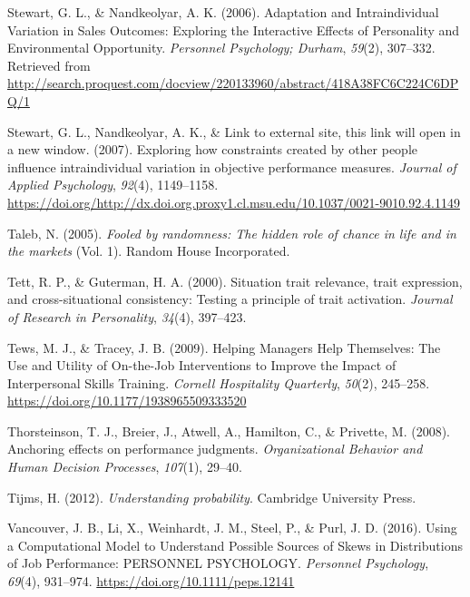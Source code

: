 \documentclass[english,,man]{apa6}
\begin{document}
\leavevmode\hypertarget{ref-stewart_adaptation_2006}{}%
Stewart, G. L., \& Nandkeolyar, A. K. (2006). Adaptation and Intraindividual Variation in Sales Outcomes: Exploring the Interactive Effects of Personality and Environmental Opportunity. \emph{Personnel Psychology; Durham}, \emph{59}(2), 307--332. Retrieved from \url{http://search.proquest.com/docview/220133960/abstract/418A38FC6C224C6DPQ/1}

\leavevmode\hypertarget{ref-stewart_exploring_2007}{}%
Stewart, G. L., Nandkeolyar, A. K., \& Link to external site, this link will open in a new window. (2007). Exploring how constraints created by other people influence intraindividual variation in objective performance measures. \emph{Journal of Applied Psychology}, \emph{92}(4), 1149--1158. \url{https://doi.org/http://dx.doi.org.proxy1.cl.msu.edu/10.1037/0021-9010.92.4.1149}

\leavevmode\hypertarget{ref-taleb_fooled_2005}{}%
Taleb, N. (2005). \emph{Fooled by randomness: The hidden role of chance in life and in the markets} (Vol. 1). Random House Incorporated.

\leavevmode\hypertarget{ref-tett_situation_2000}{}%
Tett, R. P., \& Guterman, H. A. (2000). Situation trait relevance, trait expression, and cross-situational consistency: Testing a principle of trait activation. \emph{Journal of Research in Personality}, \emph{34}(4), 397--423.

\leavevmode\hypertarget{ref-tews_helping_2009}{}%
Tews, M. J., \& Tracey, J. B. (2009). Helping Managers Help Themselves: The Use and Utility of On-the-Job Interventions to Improve the Impact of Interpersonal Skills Training. \emph{Cornell Hospitality Quarterly}, \emph{50}(2), 245--258. \url{https://doi.org/10.1177/1938965509333520}

\leavevmode\hypertarget{ref-thorsteinson_anchoring_2008}{}%
Thorsteinson, T. J., Breier, J., Atwell, A., Hamilton, C., \& Privette, M. (2008). Anchoring effects on performance judgments. \emph{Organizational Behavior and Human Decision Processes}, \emph{107}(1), 29--40.

\leavevmode\hypertarget{ref-tijms_understanding_2012}{}%
Tijms, H. (2012). \emph{Understanding probability}. Cambridge University Press.

\leavevmode\hypertarget{ref-vancouver_using_2016}{}%
Vancouver, J. B., Li, X., Weinhardt, J. M., Steel, P., \& Purl, J. D. (2016). Using a Computational Model to Understand Possible Sources of Skews in Distributions of Job Performance: PERSONNEL PSYCHOLOGY. \emph{Personnel Psychology}, \emph{69}(4), 931--974. \url{https://doi.org/10.1111/peps.12141}
\end{document}
